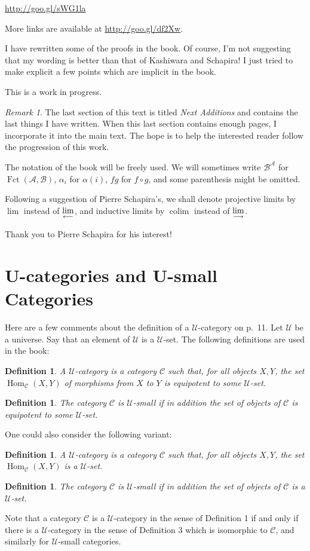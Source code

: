 \documentclass[12pt]{article}
\newtheorem{df}[thm]{Definition}%
\theoremstyle{remark}%
\newtheorem{rk}[thm]{Remark}
\newcommand{\n}{\noindent}
\newcommand{\A}{\mathcal A}
\newcommand{\B}{\mathcal B}
\newcommand{\C}{\mathcal C}
\newcommand{\U}{\mathcal U}
\newcommand{\ilim}{\operatornamewithlimits{\underset{\longrightarrow}{lim}}}
\newcommand{\plim}{\operatornamewithlimits{\underset{\longleftarrow}{lim}}}
\DeclareMathOperator*{\coli}{colim}
\DeclareMathOperator{\Fct}{Fct}
\DeclareMathOperator{\Hom}{Hom}
\begin{document}
\n\href{http://goo.gl/sWG1la}{http://goo.gl/sWG1la}

More links are available at \href{http://goo.gl/df2Xw}{http://goo.gl/df2Xw}.

I have rewritten some of the proofs in the book. Of course, I'm not suggesting that my wording is better than that of Kashiwara and Schapira! I just tried to make explicit a few points which are implicit in the book. 

This is a work in progress. %
%
\begin{rk}\label{next}
The last section of this text is titled {\em Next Additions} and contains the last things I have written. When this last section contains enough pages, %
I incorporate it into the main text. The hope is to help the interested reader follow the progression of this work.
\end{rk}
%
The notation of the book will be freely used. We will sometimes write $\B^\A$ for $\Fct(\A,\B)$, $\alpha_i$ for $\alpha(i)$, $fg$ for $f\circ g$, and some parenthesis might be omitted. 

Following a suggestion of Pierre Schapira's, we shall denote projective limits by $\lim$ instead of $\plim$, and inductive limits by $\coli$ instead of $\ilim$. 

Thank you to Pierre Schapira for his interest!%
%
\section{U-categories and U-small Categories}\label{ucat}
% 
Here are a few comments about the definition of a $\U$-category on p.~11. Let $\U$ be a universe. Say that an element of $\U$ is a $\U$-set. The following definitions are used in the book: 
%
\begin{df} 
A $\U$-category is a category $\C$ such that, for all objects $X,Y$, the set $\Hom_\C(X,Y)$ of morphisms from $X$ to $Y$ is equipotent to some $\U$-set. 
\end{df} 
% 
\begin{df}
The category $\C$ is $\U$-small if in addition the set of objects of $\C$ is equipotent to some $\U$-set. 
\end{df} 
% 
One could also consider the following variant: 
% 
\begin{df}\label{ducat}
A $\U$-category is a category $\C$ such that, for all objects $X,Y$, the set $\Hom_\C(X,Y)$ is a $\U$-set. 
\end{df} 
% 
\begin{df}\label{small}
The category $\C$ is $\U$-small if in addition the set of objects of $\C$ is a $\U$-set. 
\end{df} 
% 
Note that a category $\C$ is a $\U$-category in the sense of Definition 1 if and only if there is a $\U$-category in the sense of Definition 3 which is isomorphic to $\C$, and similarly for $\U$-small categories.\bigskip
\end{document}

